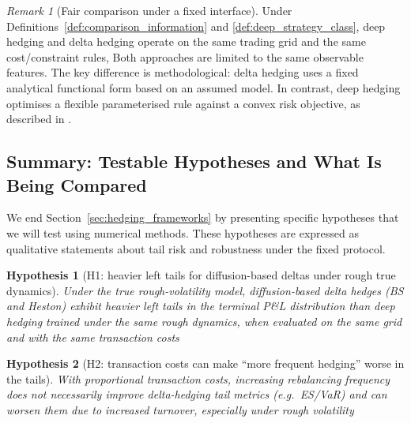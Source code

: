 \documentclass[12pt,a4paper]{article}
\theoremstyle{definition}
\theoremstyle{plain}
\newtheorem{hypothesis}{Hypothesis}
\theoremstyle{remark}
\newtheorem{remark}{Remark}[section]
\theoremstyle{plain}
\begin{document}
\label{subsubsec:deep_fairness_statement}

\begin{remark}[Fair comparison under a fixed interface]
\label{rem:deep_fairness_again}
Under Definitions~\ref{def:comparison_information} and \ref{def:deep_strategy_class}, deep hedging and delta hedging operate on the same trading grid and the same cost/constraint rules,
Both approaches are limited to the same observable features.
The key difference is methodological: delta hedging uses a fixed analytical functional form based on an assumed model.
In contrast, deep hedging optimises a flexible parameterised rule against a convex risk objective, as described in \cite{Buehler2019DeepHedging,Horvath2021DeepRough,BlackScholes1973,Heston1993,FoellmerSchied2016}.
\end{remark}

\subsection{Summary: Testable Hypotheses and What Is Being Compared}
\label{subsec:section4_hypotheses}

\noindent
We end Section~\ref{sec:hedging_frameworks} by presenting specific hypotheses that we will test using numerical methods.
These hypotheses are expressed as qualitative statements about tail risk and robustness under the fixed protocol.

\begin{hypothesis}[H1: heavier left tails for diffusion-based deltas under rough true dynamics]
\label{hyp:H1_left_tails}
Under the true rough-volatility model, diffusion-based delta hedges (BS and Heston) exhibit heavier left tails in the terminal P\&L distribution
than deep hedging trained under the same rough dynamics, when evaluated on the same grid and with the same transaction costs \cite{GatheralRough,BayerFriz2016,Horvath2021DeepRough}
\end{hypothesis}

\begin{hypothesis}[H2: transaction costs can make ``more frequent hedging'' worse in the tails]
\label{hyp:H2_costs_frequency}
With proportional transaction costs, increasing rebalancing frequency does not necessarily improve delta-hedging tail metrics
(e.g.\ ES/VaR) and can worsen them due to increased turnover, especially under rough volatility \cite{WhalleyWilmott2002,GatheralRough,Buehler2019DeepHedging}
\end{hypothesis}
\end{document}
